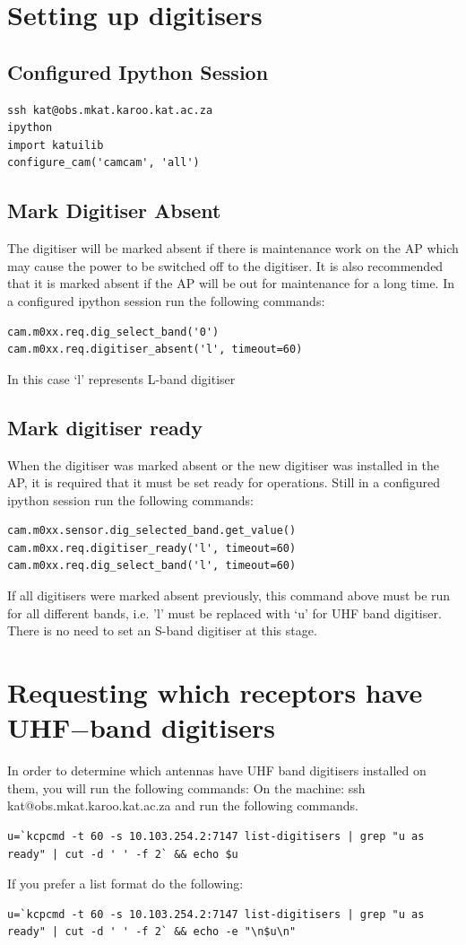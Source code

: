 \section{Setting up digitisers}
\subsection{ Configured Ipython Session}
\begin{lstlisting}[style=DOS]
ssh kat@obs.mkat.karoo.kat.ac.za
ipython
import katuilib
configure_cam('camcam', 'all')
\end{lstlisting}

\subsection{ Mark Digitiser Absent}
The digitiser will be marked absent if there is maintenance work on the AP which
may cause the power to be switched off to the digitiser. It is also recommended that it
is marked absent if the AP will be out for maintenance for a long time.
In a configured ipython session run the following commands:
\begin{lstlisting}[style=DOS]
cam.m0xx.req.dig_select_band('0')
cam.m0xx.req.digitiser_absent('l', timeout=60)
\end{lstlisting}

In this case ‘l’ represents L-band digitiser
\subsection{Mark digitiser ready}
When the digitiser was marked absent or the new digitiser was installed in the AP, it
is required that it must be set ready for operations. Still in a configured ipython
session run the following commands:
\begin{lstlisting}[style=DOS]
cam.m0xx.sensor.dig_selected_band.get_value()
cam.m0xx.req.digitiser_ready('l', timeout=60)
cam.m0xx.req.dig_select_band('l', timeout=60)
\end{lstlisting}

If all digitisers were marked absent previously, this command above must be run for
all different bands, i.e. 'l' must be replaced with ‘u’ for UHF band digitiser. There is
no need to set an S-band digitiser at this stage.
\section{ Requesting which receptors have UHF$-$band digitisers}
In order to determine which antennas have UHF band digitisers installed on them, you will
run the following commands:
On the machine: ssh kat@obs.mkat.karoo.kat.ac.za and run the following commands.
\begin{lstlisting}[style=DOS]
u=`kcpcmd -t 60 -s 10.103.254.2:7147 list-digitisers | grep "u as
ready" | cut -d ' ' -f 2` && echo $u
\end{lstlisting}
If you prefer a list format do the following:
\begin{lstlisting}[style=DOS]
u=`kcpcmd -t 60 -s 10.103.254.2:7147 list-digitisers | grep "u as
ready" | cut -d ' ' -f 2` && echo -e "\n$u\n"
\end{lstlisting}


